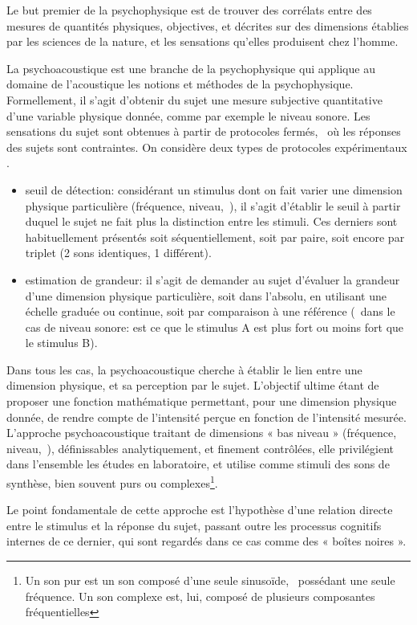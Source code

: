 Le but premier de la psychophysique est de trouver des corrélats entre des mesures de quantités physiques, objectives, et décrites sur des dimensions établies par les sciences de la nature, et les sensations qu'elles produisent chez l'homme.

La psychoacoustique est une branche de la psychophysique qui applique au domaine de l'acoustique les notions et méthodes de la psychophysique. Formellement, il s'agit d'obtenir du sujet une mesure subjective quantitative d'une variable physique donnée, comme par exemple le niveau sonore. Les sensations du sujet sont obtenues à partir de protocoles fermés, \ie~où les réponses des sujets sont contraintes. On considère deux types de protocoles expérimentaux \citep[p. 29-30]{guastavino_etude_2003}.

\begin{itemize}
\item seuil de détection: considérant un stimulus dont on fait varier une dimension physique particulière (fréquence, niveau,~\etc), il s'agit d'établir le seuil à partir duquel le sujet ne fait plus la distinction entre les stimuli. Ces derniers sont habituellement présentés soit séquentiellement, soit par paire, soit encore par triplet (2 sons identiques, 1 différent).
\item estimation de grandeur: il s'agit de demander au sujet d'évaluer la grandeur d'une dimension physique particulière, soit dans l'absolu, en utilisant une échelle graduée ou continue, soit par comparaison à une référence (\eg~dans le cas de niveau sonore: est ce que le stimulus A est plus fort ou moins fort que le stimulus B).
\end{itemize}

Dans tous les cas, la psychoacoustique cherche à établir le lien entre une dimension physique, et sa perception par le sujet. L'objectif ultime étant de proposer une fonction mathématique permettant, pour une dimension physique donnée, de rendre compte de l'intensité perçue en fonction de l'intensité mesurée. L'approche psychoacoustique traitant de dimensions « bas niveau » (fréquence, niveau,~\etc),  définissables analytiquement, et finement contrôlées, elle privilégient dans l'ensemble les études en laboratoire, et utilise comme stimuli des sons de synthèse, bien souvent purs ou complexes\footnote{Un son pur est un son composé d'une seule sinusoïde, \ie~possédant une seule fréquence. Un son complexe est, lui, composé de plusieurs composantes fréquentielles}.

Le point fondamentale de cette approche est l'hypothèse d'une relation directe entre le stimulus et la réponse du sujet, passant outre les processus cognitifs internes de ce dernier, qui sont regardés dans ce cas comme des « boîtes noires ».


